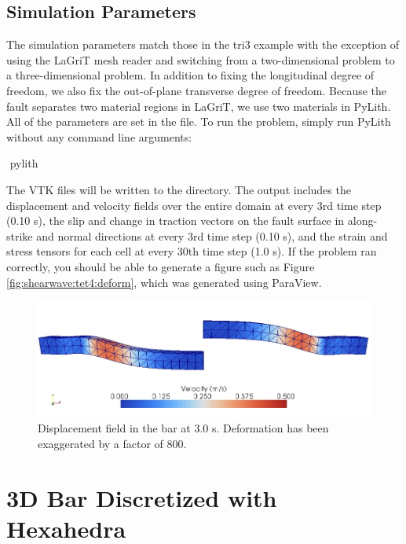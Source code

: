 \subsection{Simulation Parameters}

The simulation parameters match those in the tri3 example with the
exception of using the LaGriT mesh reader and switching from a
two-dimensional problem to a three-dimensional problem. In addition to
fixing the longitudinal degree of freedom, we also fix the
out-of-plane transverse degree of freedom. Because the fault separates
two material regions in LaGriT, we use two materials in PyLith. All of
the parameters are set in the  file. To run
the problem, simply run PyLith without any command line arguments:
\begin{shell}
$$ pylith
\end{shell}
The VTK files will be written to the  directory. The
output includes the displacement and velocity fields over the entire
domain at every 3rd time step (0.10 s), the slip and change in
traction vectors on the fault surface in along-strike and normal
directions at every 3rd time step (0.10 s), and the strain and stress
tensors for each cell at every 30th time step (1.0 s). If the problem
ran correctly, you should be able to generate a figure such as Figure
\vref{fig:shearwave:tet4:deform}, which was generated using ParaView.

\begin{figure}
  \includegraphics[scale=0.5]{examples/figs/shearwave_tet4deform30}
  \caption{Displacement field in the bar at 3.0 s. Deformation has been exaggerated
    by a factor of 800.}
  \label{fig:shearwave:tet4:deform}
\end{figure}


\section{3D Bar Discretized with Hexahedra}
\label{sec:example:shearwave:hex8}

